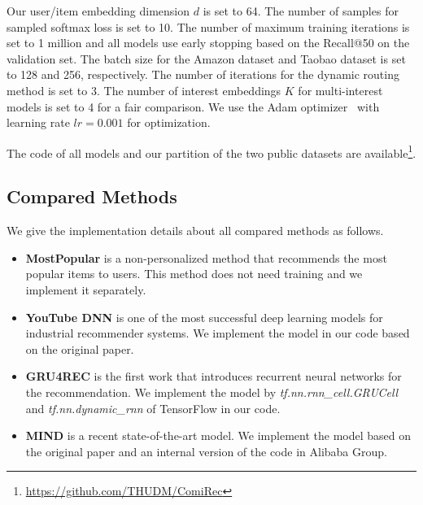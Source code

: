 Our user/item embedding dimension $d$ is set to 64. The number of samples for sampled softmax loss is set to 10. The number of maximum training iterations is set to 1 million and all models use early stopping based on the Recall@50 on the validation set. The batch size for the Amazon dataset and Taobao dataset is set to 128 and 256, respectively. The number of iterations for the dynamic routing method is set to 3. The number of interest embeddings $K$ for multi-interest models is set to 4 for a fair comparison. We use the Adam optimizer~\cite{kingma2014adam} with learning rate $lr=0.001$ for optimization.

The code of all models and our partition of the two public datasets are available\footnote{\url{https://github.com/THUDM/ComiRec}}. 

\subsection{Compared Methods}
We give the implementation details about all compared methods as follows. 

\begin{itemize}
    \item \textbf{MostPopular} is a non-personalized method that recommends the most popular items to users. This method does not need training and we implement it separately. 
    \item \textbf{YouTube DNN} is one of the most successful deep learning models for industrial recommender systems. We implement the model in our code based on the original paper.
    \item \textbf{GRU4REC} is the first work that introduces recurrent neural networks for the recommendation. We implement the model by \textit{tf.nn.rnn\_cell.GRUCell} and \textit{tf.nn.dynamic\_rnn} of TensorFlow in our code.
    \item \textbf{MIND} is a recent state-of-the-art model. We implement the model based on the original paper and an internal version of the code in Alibaba Group. 
\end{itemize}


